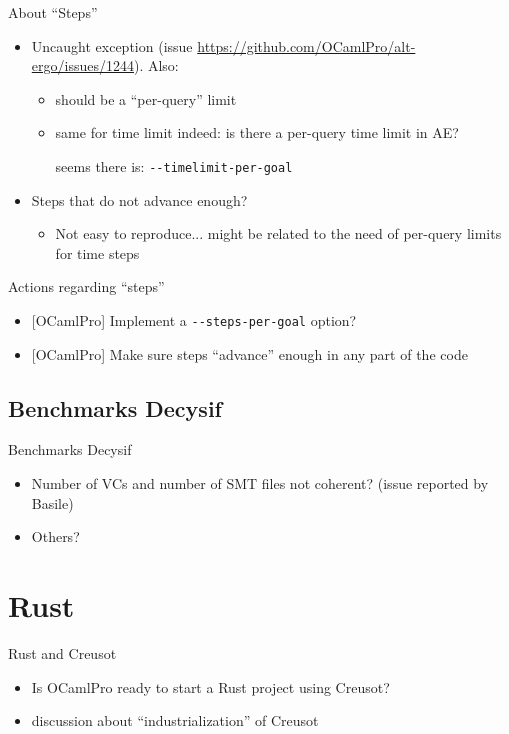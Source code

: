 \documentclass[aspectratio=169]{beamer}
\begin{document}
\begin{frame}{About ``Steps''}

  \begin{itemize}
  \item Uncaught exception (issue
    \url{https://github.com/OCamlPro/alt-ergo/issues/1244}). Also:
    \begin{itemize}
    \item should be a ``per-query'' limit
    \item same for time limit indeed: is there a per-query time limit in AE?

      seems there is: \texttt{-{}-timelimit-per-goal}
    \end{itemize}
  \item Steps that do not advance enough?
    \begin{itemize}
    \item Not easy to reproduce... might be related to the need of
      per-query limits for time steps
    \end{itemize}
  \end{itemize}

\end{frame}

\begin{frame}{Actions regarding ``steps''}

  \begin{itemize}
  \item{} [OCamlPro] Implement a \texttt{-{}-steps-per-goal} option?
  \item{} [OCamlPro] Make sure steps ``advance'' enough in any part of the code
  \end{itemize}

\end{frame}

\subsection{Benchmarks Decysif}

\begin{frame}{Benchmarks Decysif}

  \begin{itemize}
  \item Number of VCs and number of SMT files not coherent? (issue reported by Basile)
  \item Others?
  \end{itemize}

\end{frame}

\section{Rust}

\begin{frame}{Rust and Creusot}

  \begin{itemize}
  \item Is OCamlPro ready to start a Rust project using Creusot?
  \item{} discussion about ``industrialization'' of Creusot
  \end{itemize}

\end{frame}
\end{document}

